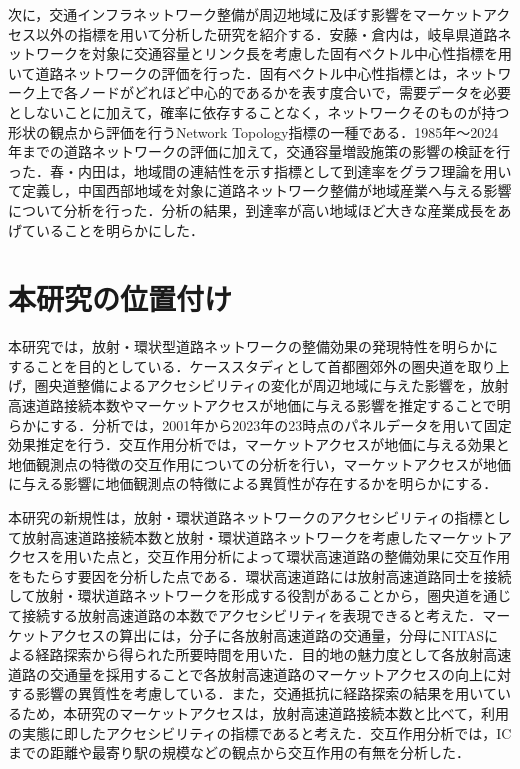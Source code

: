 次に，交通インフラネットワーク整備が周辺地域に及ぼす影響をマーケットアクセス以外の指標を用いて分析した研究を紹介する．安藤・倉内\cite{kurauchi2020}は，岐阜県道路ネットワークを対象に交通容量とリンク長を考慮した固有ベクトル中心性指標を用いて道路ネットワークの評価を行った．固有ベクトル中心性指標とは，ネットワーク上で各ノードがどれほど中心的であるかを表す度合いで，需要データを必要としないことに加えて，確率に依存することなく，ネットワークそのものが持つ形状の観点から評価を行うNetwork Topology指標の一種である．1985年〜2024年までの道路ネットワークの評価に加えて，交通容量増設施策の影響の検証を行った．春・内田\cite{haru2011}は，地域間の連結性を示す指標として到達率をグラフ理論を用いて定義し，中国西部地域を対象に道路ネットワーク整備が地域産業へ与える影響について分析を行った．分析の結果，到達率が高い地域ほど大きな産業成長をあげていることを明らかにした．

\section{本研究の位置付け}
本研究では，放射・環状型道路ネットワークの整備効果の発現特性を明らかにすることを目的としている．ケーススタディとして首都圏郊外の圏央道を取り上げ，圏央道整備によるアクセシビリティの変化が周辺地域に与えた影響を，放射高速道路接続本数やマーケットアクセスが地価に与える影響を推定することで明らかにする．分析では，2001年から2023年の23時点のパネルデータを用いて固定効果推定を行う．交互作用分析では，マーケットアクセスが地価に与える効果と地価観測点の特徴の交互作用についての分析を行い，マーケットアクセスが地価に与える影響に地価観測点の特徴による異質性が存在するかを明らかにする．

本研究の新規性は，放射・環状道路ネットワークのアクセシビリティの指標として放射高速道路接続本数と放射・環状道路ネットワークを考慮したマーケットアクセスを用いた点と，交互作用分析によって環状高速道路の整備効果に交互作用をもたらす要因を分析した点である．環状高速道路には放射高速道路同士を接続して放射・環状道路ネットワークを形成する役割があることから，圏央道を通じて接続する放射高速道路の本数でアクセシビリティを表現できると考えた．マーケットアクセスの算出には，分子に各放射高速道路の交通量，分母にNITASによる経路探索から得られた所要時間を用いた．目的地の魅力度として各放射高速道路の交通量を採用することで各放射高速道路のマーケットアクセスの向上に対する影響の異質性を考慮している．また，交通抵抗に経路探索の結果を用いているため，本研究のマーケットアクセスは，放射高速道路接続本数と比べて，利用の実態に即したアクセシビリティの指標であると考えた．交互作用分析では，ICまでの距離や最寄り駅の規模などの観点から交互作用の有無を分析した．

